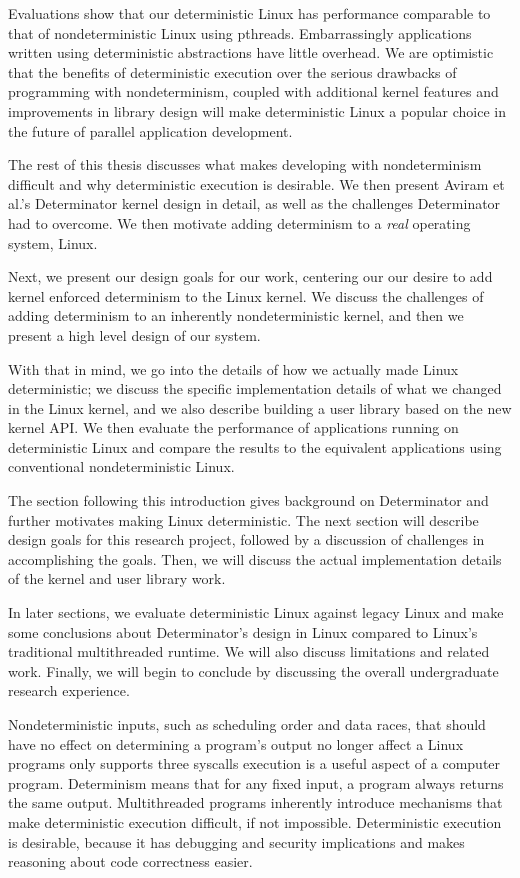 Evaluations show that our deterministic Linux has performance comparable to
that of nondeterministic Linux using pthreads. Embarrassingly applications
written using deterministic abstractions have little overhead. We are optimistic
that the benefits of deterministic execution over the serious drawbacks of
programming with nondeterminism, coupled with additional kernel features and
improvements in library design will make deterministic Linux a popular choice
in the future of parallel application development.

\iffalse
The rest of this thesis discusses what makes developing with nondeterminism
difficult and why deterministic execution is desirable. We then present Aviram
et al.'s Determinator kernel design in detail, as well as the challenges
Determinator had to overcome. We then motivate adding determinism to a
\emph{real} operating system, Linux.

Next, we present our design goals for our work, centering our our desire to add
kernel enforced determinism to the Linux kernel. We discuss the challenges of
adding determinism to an inherently nondeterministic kernel, and then we present
a high level design of our system.

With that in mind, we go into the details of how we actually made Linux
deterministic; we discuss the specific implementation details of what we changed
in the Linux kernel, and we also describe building a user library based on the
new kernel API. We then evaluate the performance of applications running on
deterministic Linux and compare the results to the equivalent applications
using conventional nondeterministic Linux.

The section following this introduction gives background on Determinator and
further motivates making Linux deterministic. The next section will describe
design goals for this research project, followed by a discussion of challenges
in accomplishing the goals. Then, we will discuss the actual implementation
details of the kernel and user library work.

In later sections, we evaluate deterministic Linux against legacy Linux and
make some conclusions about Determinator's design in Linux compared to Linux's
traditional multithreaded runtime. We will also discuss limitations and related
work. Finally, we will begin to conclude by discussing the overall undergraduate
research experience.

Nondeterministic inputs, such as scheduling order and data
races, that should have no effect on determining a program's output no longer
affect a Linux programs 
only supports three syscalls
 execution is a useful aspect of a computer program. Determinism
means that for any fixed input, a program always returns the same output.
Multithreaded programs inherently introduce mechanisms that make deterministic
execution difficult, if not impossible. Deterministic execution is desirable,
because it has debugging and security implications and makes reasoning about
code correctness easier.

